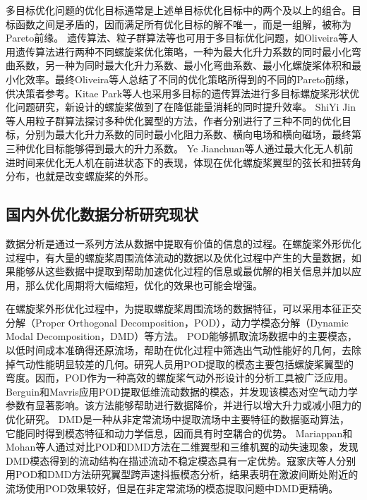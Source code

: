 多目标优化问题的优化目标通常是上述单目标优化目标中的两个及以上的组合。目标函数之间是矛盾的，因而满足所有优化目标的解不唯一，而是一组解，被称为Pareto前缘。
遗传算法、粒子群算法等也可用于多目标优化问题，如Oliveira等人用遗传算法进行两种不同螺旋桨优化策略\cite{Oliveira2023}，一种为最大化升力系数的同时最小化弯曲系数，另一种为同时最大化升力系数、最小化弯曲系数、最小化螺旋桨体积和最小化效率。最终Oliveira等人总结了不同的优化策略所得到的不同的Pareto前缘，供决策者参考。Kitae Park等人也采用多目标的遗传算法进行多目标螺旋桨形状优化问题研究，新设计的螺旋桨做到了在降低能量消耗的同时提升效率\cite{Park2022}。
ShiYi Jin等人用粒子群算法探讨多种优化翼型的方法\cite{Jin2024}，作者分别进行了三种不同的优化目标，分别为最大化升力系数的同时最小化阻力系数、横向电场和横向磁场，最终第三种优化目标能够得到最大的升力系数。
Ye Jianchuan等人通过最大化无人机前进时间来优化无人机在前进状态下的表现，体现在优化螺旋桨翼型的弦长和扭转角分布，也就是改变螺旋桨的外形\cite{Ye2021}。

\vspace{0.8em}
\subsection{国内外优化数据分析研究现状}\label{Sec: data analysis}
\vspace{0.8em}

数据分析是通过一系列方法从数据中提取有价值的信息的过程。在螺旋桨外形优化过程中，有大量的螺旋桨周围流体流动的数据以及优化过程中产生的大量数据，如果能够从这些数据中提取到帮助加速优化过程的信息或最优解的相关信息并加以应用，那么优化周期将大幅缩短，优化的效果也可能会增强。

在螺旋桨外形优化过程中，为提取螺旋桨周围流场的数据特征，可以采用本征正交分解（Proper Orthogonal Decomposition，POD），动力学模态分解（Dynamic Modal Decomposition，DMD）等方法。
POD能够抓取流场数据中的主要模态，以低时间成本准确得还原流场\cite{Masters2017}，帮助在优化过程中筛选出气动性能好的几何，去除掉气动性能明显较差的几何\cite{Taol2010}。研究人员用POD提取的模态主要包括螺旋桨翼型的弯度\cite{Poole2015,Li2019}。因而，POD作为一种高效的螺旋桨气动外形设计的分析工具被广泛应用。Berguin和Mavris\cite{Berguin2014, Berguin2015}应用POD提取低维流动数据的模态，并发现该模态对空气动力学参数有显著影响。该方法能够帮助进行数据降价，并进行以增大升力或减小阻力的优化研究\cite{Grey2018,LiJichao2019}。
DMD是一种从非定常流场中提取流场中主要特征的数据驱动算法， 它能同时得到模态特征和动力学信息，因而具有时空耦合的优势。
Mariappan\cite{Mariappan2014}和Mohan\cite{Mohan2015}等人通过对比POD和DMD方法在二维翼型和三维机翼的动失速现象，发现DMD模态得到的流动结构在描述流动不稳定模态具有一定优势。寇家庆\cite{KouJQ2016}等人分别用POD和DMD方法研究翼型跨声速抖振模态分析，结果表明在激波间断处附近的流场使用POD效果较好，但是在非定常流场的模态提取问题中DMD更精确。

